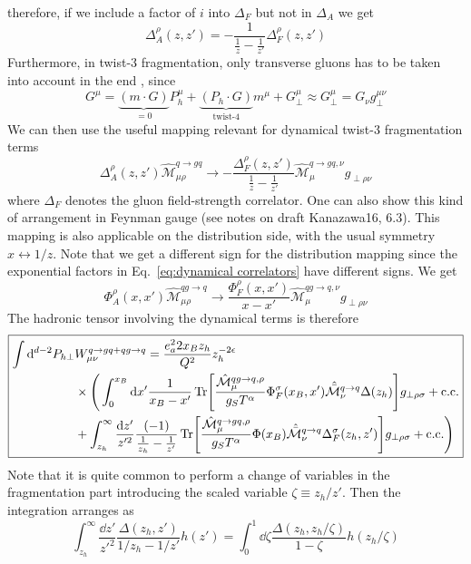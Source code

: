 therefore, if we include a factor of $i$ into $\Delta_F$ but not in $\Delta_A$ we get
\begin{equation}
     \Delta_A^\rho(z,z')=-\frac{1}{\frac{1}{z}-\frac{1}{z'}}\Delta^\rho_F(z,z')
\end{equation}
Furthermore, in twist-3 fragmentation, only transverse gluons has to be taken into account in the end \cite{boer_universality_2003}, since 
\begin{equation}
    G^\mu=\underbrace{(m\cdot G)}_{=0}P_h^\mu+\underbrace{(P_h \cdot G)}_{\text{twist-4}}m^\mu+G_\perp^\mu\approx G_\perp^\mu=G_\nu g_\perp^{\mu\nu}
\end{equation}
We can then use the useful mapping relevant for dynamical twist-3 fragmentation terms
\begin{equation}
    \Delta_A^\rho(z,z')\hat{ \mathcal{M}}^{q \to gq}_{\mu\rho}\to-\frac{\Delta_F^\rho(z,z')}{\frac{1}{z}-\frac{1}{z'}}\hat{ \mathcal{M}}_\mu^{q\to gq,\nu}g_{\perp\rho\nu}
\end{equation}
where $\Delta_F$ denotes the gluon field-strength correlator. One can also show this kind of arrangement in Feynman gauge (see notes on draft Kanazawa16, 6.3). This mapping is also applicable on the distribution side, with the usual symmetry $x \leftrightarrow1/z$. Note that we get a different sign for the distribution mapping since the exponential factors in Eq.~\ref{eq:dynamical correlators} have different signs. We get
\begin{equation}
    \Phi_A^\rho(x,x')\hat{ \mathcal{M}}^{q g\to q}_{\mu\rho}\to\frac{\Phi_F^\rho(x,x')}{x-x'}\hat{ \mathcal{M}}_\mu^{qg\to q,\nu}g_{\perp\rho\nu}
\end{equation}
The hadronic tensor involving the dynamical terms is therefore
\begin{equation}    \label{eq:hadronic tensor LO dynamical}\boxed{
    \begin{aligned}
            \int\dd^{d-2}P_{h\perp}& W_{\mu\nu}^{q \to gq+qg\to q} = \frac{e_a^22x_B z_h}{Q^2} z_h^{-2\epsilon}\\&\times\Bigg(\int _0^{x_B}\dd x'\frac{1}{x_B-x'}\Tr[\frac{\hat{\mathcal{M}}_\mu^{q g \to q,\rho}}{g_S T^\alpha} \Phi_F^\sigma(x_B,x')\hat{\bar{\mathcal{M}}}_\nu^{q\to q}\Delta(z_h)]g_{\perp\rho\sigma} + \text{c.c.}\\
        &+\int _{z_h}^\infty\frac{\dd z'}{z'^2}\frac{(-1)}{\frac{1}{z_h}-\frac{1}{z'}}\Tr[\frac{\hat{\mathcal{M}}_\mu^{q  \to g q,\rho}}{g_S T^\alpha}\Phi(x_B)\hat{\bar{\mathcal{M}}}_\nu^{q\to q}\Delta_F^\sigma(z_h,z')]g_{\perp\rho\sigma}  + \text{c.c.}\Bigg)
    \end{aligned} }
\end{equation}
Note that it is quite common to perform a change of variables in the fragmentation part introducing the scaled variable $\zeta \equiv z_h/z'$. Then the integration arranges as
\begin{equation}
    \int_{z_h}^\infty\frac{\dd z'}{z'^2}\frac{\Delta(z_h,z')}{1/z_h-1/z'} h(z')= \int_{0}^1 \dd \zeta\frac{\Delta\left(z_h,z_h/\zeta\right)}{1-\zeta}h(z_h/\zeta)
\end{equation}

